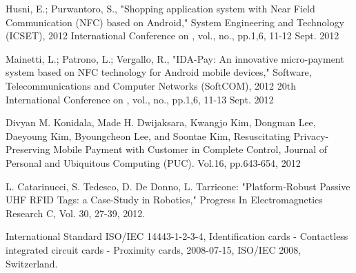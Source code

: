 \documentclass[12pt,a4paper,twocolumn]{article}
\begin{document}
\begin{thebibliography}{depth}

 Husni, E.; Purwantoro, S., "Shopping application system with Near Field Communication (NFC) based on Android," System Engineering and Technology (ICSET), 2012 International Conference on , vol., no., pp.1,6, 11-12 Sept. 2012
  
 Mainetti, L.; Patrono, L.; Vergallo, R., "IDA-Pay: An innovative micro-payment system based on NFC technology for Android mobile devices," Software, Telecommunications and Computer Networks (SoftCOM), 2012 20th International Conference on , vol., no., pp.1,6, 11-13 Sept. 2012

 Divyan M. Konidala, Made H. Dwijaksara, Kwangjo Kim, Dongman Lee, Daeyoung Kim, Byoungcheon Lee, and Soontae Kim, Resuscitating Privacy-Preserving Mobile Payment with Customer in Complete Control, Journal of Personal and Ubiquitous Computing (PUC). Vol.16, pp.643-654, 2012
  
 L. Catarinucci, S. Tedesco, D. De Donno, L. Tarricone: "Platform-Robust Passive UHF RFID Tags: a Case-Study in Robotics," Progress In Electromagnetics Research C, Vol. 30, 27-39, 2012.
  
 International Standard ISO/IEC 14443-1-2-3-4, Identification cards - Contactless integrated circuit cards - Proximity cards, 2008-07-15, ISO/IEC 2008, Switzerland.

\end{thebibliography}
\end{document}

